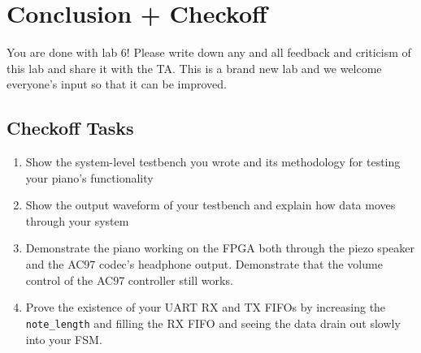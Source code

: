 \documentclass[11pt]{article}
\begin{document}
\section{Conclusion + Checkoff}
You are done with lab 6! Please write down any and all feedback and criticism of this lab and share it with the TA. This is a brand new lab and we welcome everyone's input so that it can be improved.

\subsection{Checkoff Tasks}
\begin{enumerate}
	\item Show the system-level testbench you wrote and its methodology for testing your piano's functionality
	\item Show the output waveform of your testbench and explain how data moves through your system
	\item Demonstrate the piano working on the FPGA both through the piezo speaker and the AC97 codec's headphone output. Demonstrate that the volume control of the AC97 controller still works.
	\item Prove the existence of your UART RX and TX FIFOs by increasing the \verb|note_length| and filling the RX FIFO and seeing the data drain out slowly into your FSM.
\end{enumerate}
\end{document}
